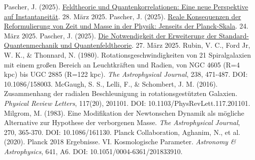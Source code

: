 \documentclass[12pt,a4paper]{article}
\begin{document}
\begin{thebibliography}{99}
	 Pascher, J. (2025). \href{https://github.com/jpascher/T0-Time-Mass-Duality/tree/main/2/pdf/Deutsch/FeldtheorieQuanten.pdf}{Feldtheorie und Quantenkorrelationen: Eine neue Perspektive auf Instantaneität}. 28. März 2025.
	 Pascher, J. (2025). \href{https://github.com/jpascher/T0-Time-Mass-Duality/tree/main/2/pdf/Deutsch/JenseitsPlanck.pdf}{Reale Konsequenzen der Reformulierung von Zeit und Masse in der Physik: Jenseits der Planck-Skala}. 24. März 2025.
	 Pascher, J. (2025). \href{https://github.com/jpascher/T0-Time-Mass-Duality/tree/main/2/pdf/Deutsch/NotwendigkeitQMErweiterung.pdf}{Die Notwendigkeit der Erweiterung der Standard-Quantenmechanik und Quantenfeldtheorie}. 27. März 2025.
	 Rubin, V. C., Ford Jr, W. K., \& Thonnard, N. (1980). Rotationsgeschwindigkeiten von 21 Spiralgalaxien mit einem großen Bereich an Leuchtkräften und Radien, von NGC 4605 (R=4 kpc) bis UGC 2885 (R=122 kpc). \textit{The Astrophysical Journal}, 238, 471-487. DOI: 10.1086/158003.
	 McGaugh, S. S., Lelli, F., \& Schombert, J. M. (2016). Zusammenhang der radialen Beschleunigung in rotationsgestützten Galaxien. \textit{Physical Review Letters}, 117(20), 201101. DOI: 10.1103/PhysRevLett.117.201101.
	 Milgrom, M. (1983). Eine Modifikation der Newtonschen Dynamik als mögliche Alternative zur Hypothese der verborgenen Masse. \textit{The Astrophysical Journal}, 270, 365-370. DOI: 10.1086/161130.
	 Planck Collaboration, Aghanim, N., et al. (2020). Planck 2018 Ergebnisse. VI. Kosmologische Parameter. \textit{Astronomy \& Astrophysics}, 641, A6. DOI: 10.1051/0004-6361/201833910.
\end{thebibliography}
	
\end{document}
